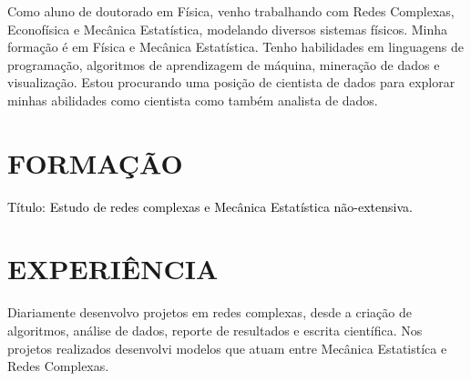 \documentclass[12pt,a4paper,roman]{moderncv}        %
\begin{document}
\makecvtitle

\small{Como aluno de doutorado em Física, venho trabalhando com Redes Complexas, Econofísica e Mecânica Estatística, modelando diversos sistemas físicos. Minha formação é em Física e Mecânica Estatística. Tenho habilidades em linguagens de programação, algoritmos de aprendizagem de máquina, mineração de dados e visualização. Estou procurando uma posição de cientista de dados para explorar minhas abilidades como cientista como também analista de dados.}

\section{FORMAÇÃO}

\vspace{6pt}


\vspace{6pt}

\textcolor{black}{Título: Estudo de redes complexas e Mecânica Estatística não-extensiva.}  %

\vspace{6pt}


\section{EXPERIÊNCIA}

\vspace{6pt}
Diariamente desenvolvo projetos em redes complexas, desde a criação de algoritmos, análise de dados, reporte de resultados e escrita científica. Nos projetos realizados desenvolvi modelos que atuam entre Mecânica Estatistíca e Redes Complexas.
\vspace{6pt}
\end{document}
